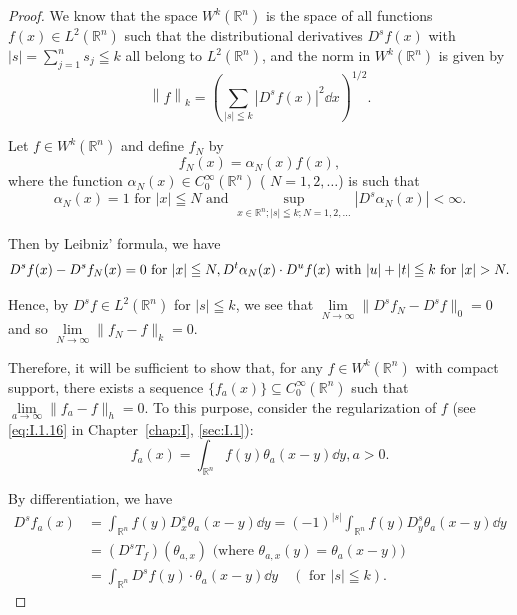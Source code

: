\begin{proof}
 We know that the space $W^{k}(\mathbb{R}^{n})$ is the space of all functions $f(x) \in L^{2}(\mathbb{R}^{n})$ such that the distributional derivatives $D^{s}f(x)$ with $|s| = \sum\limits_{j=1}^{n}s_{j} \leqq k$ all belong to $L^{2}(\mathbb{R}^{n})$, and the norm in $W^{k}(\mathbb{R}^{n})$ is given by 
\[
\left\| f \right\|_{k} = \left(\sum\limits_{| s | \leqq k} \left| D ^{s} f (x) \right| ^{2} \dd x\right) ^{1/2}. \]

Let $f \in W^{k}(\mathbb{R}^{n})$ and define $f_{N}$ by 
\[
f_{N} (x) = \alpha_{N} (x) f (x),
\]
where the function $\alpha_{N}(x) \in C_{0}^{\infty}(\mathbb{R}^{n})$ ( $N = 1, 2, \ldots$) is such that 
\[
\alpha_{N} (x) = 1 \text{ for } | x | \leqq N \text{ and } \sup\limits_ {x \in \mathbb{R}^{n}; | s | \leqq k; N = 1, 2, \dots} | D ^{s} \alpha_{N} (x) | < \infty .
\]

Then by Leibniz' formula, we have 
\begin{equation}D ^{s} f (x)- D ^{s} f_{N} (x) = 0 \text{ for } | x | \leqq N, D ^{t} \alpha_{N} (x) \cdot D ^{u} f (x) \text{ with } | u | + | t | \leqq k \text{ for } | x | > N. \notag\end{equation}

Hence, by $D^s f \in L^2(\mathbb{R}^{n})$ for $|s| \leqq k$, we see that $\lim\limits_{N \to \infty} \|D^s f_N- D^s f\|_0 = 0$ and so $\lim\limits_{N \to \infty} \|f_N- f\|_k = 0$. 

Therefore, it will be sufficient to show that, for any $f \in W^{k}(\mathbb{R}^{n})$ with compact support, there exists a sequence $\{f_{a}(x)\} \subseteq C_{0}^{\infty}(\mathbb{R}^{n})$ such that $\lim\limits_{a \to \infty} \|f_{a}- f\|_{h} = 0$. To this purpose, consider the regularization of $f$ (see \eqref{eq:I.1.16} in Chapter~\ref{chap:I}, \ref{sec:I.1}): 
\[
f_{a} (x) = \int_ {\mathbb{R}^{n}} f (y) \theta_{a} (x- y) \dd y, a > 0.
\]

By differentiation, we have 
\[
\begin{aligned}
D ^{s} f_{a} (x) &= \int_ {\mathbb{R}^{n}} f (y) D_{x} ^{s} \theta_{a} (x- y) \dd y = (- 1) ^{|s|} \int_ {\mathbb{R}^{n}} f (y) D_{y} ^{s} \theta_{a} (x- y) \dd y
\\
\qquad &= (D ^{s} T_{f}) (\theta_{a,x}) \text{ (where } \theta_{a,x} (y) = \theta_{a} (x- y))
\\
\qquad &= \int_ {\mathbb{R}^{n}} D ^{s} f (y) \cdot \theta_{a} (x- y) \dd y \quad (\text{ for } | s | \leqq k).
\end{aligned}
\]


\end{proof}

